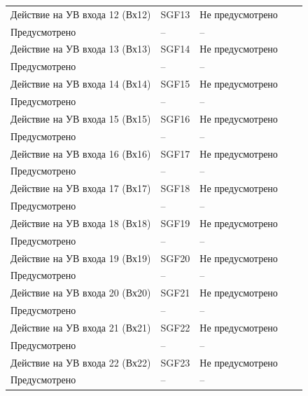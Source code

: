 \begin{longtable}{|>{\centering\arraybackslash}m{5.3cm}|>{\centering\arraybackslash}m{3.3cm}|>{\centering\arraybackslash}m{4.2cm}|>{\centering\arraybackslash}m{1.8cm}|>{\centering\arraybackslash}m{1cm}|}
\hline
\centering Действие на УВ входа 12 (Вх12)  & \centering SGF13 & \centering Не предусмотрено \\ Предусмотрено & \centering -- & \centering \arraybackslash -- \\
\hline
\centering Действие на УВ входа 13 (Вх13)  & \centering SGF14 & \centering Не предусмотрено \\ Предусмотрено & \centering -- & \centering \arraybackslash -- \\
\hline
\centering Действие на УВ входа 14 (Вх14)  & \centering SGF15 & \centering Не предусмотрено \\ Предусмотрено & \centering -- & \centering \arraybackslash -- \\
\hline
\centering Действие на УВ входа 15 (Вх15)  & \centering SGF16 & \centering Не предусмотрено \\ Предусмотрено & \centering -- & \centering \arraybackslash -- \\
\hline
\centering Действие на УВ входа 16 (Вх16)  & \centering SGF17 & \centering Не предусмотрено \\ Предусмотрено & \centering -- & \centering \arraybackslash -- \\
\hline
\centering Действие на УВ входа 17 (Вх17)  & \centering SGF18 & \centering Не предусмотрено \\ Предусмотрено & \centering -- & \centering \arraybackslash -- \\
\hline
\centering Действие на УВ входа 18 (Вх18)  & \centering SGF19 & \centering Не предусмотрено \\ Предусмотрено & \centering -- & \centering \arraybackslash -- \\
\hline
\centering Действие на УВ входа 19 (Вх19)  & \centering SGF20 & \centering Не предусмотрено \\ Предусмотрено & \centering -- & \centering \arraybackslash -- \\
\hline
\centering Действие на УВ входа 20 (Вх20)  & \centering SGF21 & \centering Не предусмотрено \\ Предусмотрено & \centering -- & \centering \arraybackslash -- \\
\hline
\centering Действие на УВ входа 21 (Вх21)  & \centering SGF22 & \centering Не предусмотрено \\ Предусмотрено & \centering -- & \centering \arraybackslash -- \\
\hline
\centering Действие на УВ входа 22 (Вх22)  & \centering SGF23 & \centering Не предусмотрено \\ Предусмотрено & \centering -- & \centering \arraybackslash -- \\

\end{longtable}
